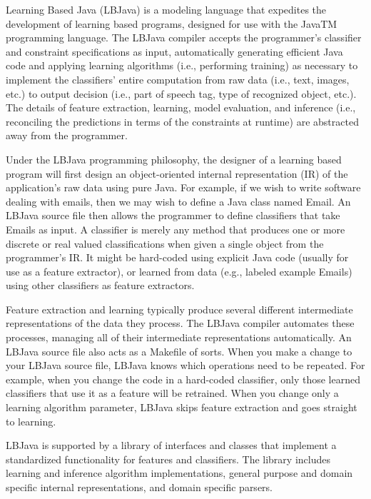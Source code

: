 Learning Based Java (LBJava) is a modeling language that expedites the
development of learning based programs, designed for use with the JavaTM
programming language.  The LBJava compiler accepts the programmer's classifier
and constraint specifications as input, automatically generating efficient
Java code and applying learning algorithms (i.e., performing training) as
necessary to implement the classifiers' entire computation from raw data
(i.e., text, images, etc.) to output decision (i.e., part of speech tag, type
of recognized object, etc.).  The details of feature extraction, learning,
model evaluation, and inference (i.e., reconciling the predictions in terms of
the constraints at runtime) are abstracted away from the programmer.

Under the LBJava programming philosophy, the designer of a learning based program
will first design an object-oriented internal representation (IR) of the
application's raw data using pure Java.  For example, if we wish to write
software dealing with emails, then we may wish to define a Java class named
Email.  An LBJava source file then allows the programmer to define classifiers
that take Emails as input.  A classifier is merely any method that produces
one or more discrete or real valued classifications when given a single object
from the programmer's IR.  It might be hard-coded using explicit Java code
(usually for use as a feature extractor), or learned from data (e.g., labeled
example Emails) using other classifiers as feature extractors.

Feature extraction and learning typically produce several different
intermediate representations of the data they process.  The LBJava compiler
automates these processes, managing all of their intermediate representations
automatically.  An LBJava source file also acts as a Makefile of sorts.  When you
make a change to your LBJava source file, LBJava knows which operations need to be
repeated.  For example, when you change the code in a hard-coded classifier,
only those learned classifiers that use it as a feature will be retrained.
When you change only a learning algorithm parameter, LBJava skips feature
extraction and goes straight to learning.

LBJava is supported by a library of interfaces and classes that implement a
standardized functionality for features and classifiers.  The library includes
learning and inference algorithm implementations, general purpose and domain
specific internal representations, and domain specific parsers.

